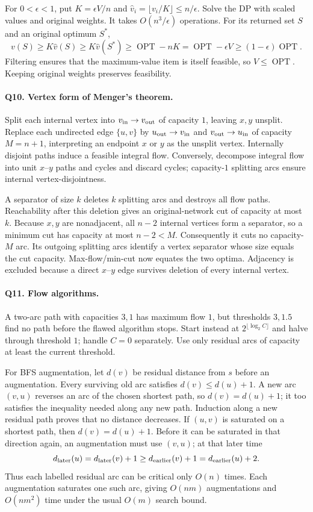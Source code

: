 \documentclass[10pt]{article}
\theoremstyle{definition}
\newcommand{\OPT}{\operatorname{OPT}}
\begin{document}
For $0<\epsilon<1$, put $K=\epsilon V/n$ and
$\widehat v_i=\lfloor v_i/K\rfloor\le n/\epsilon$.  Solve the DP with
scaled values and original weights.  It takes $O(n^3/\epsilon)$ operations.
For its returned set $S$ and an original optimum $S^*$,
\[
v(S)\ge K\widehat v(S)\ge K\widehat v(S^*)
\ge\OPT-nK=\OPT-\epsilon V\ge(1-\epsilon)\OPT.
\]
Filtering ensures that the maximum-value item is itself feasible, so
$V\le\OPT$.  Keeping original weights preserves feasibility.

\paragraph{Q10. Vertex form of Menger's theorem.}
Split each internal vertex into $v_{\rm in}\to v_{\rm out}$ of capacity
$1$, leaving $x,y$ unsplit.  Replace each undirected edge $\{u,v\}$ by
$u_{\rm out}\to v_{\rm in}$ and $v_{\rm out}\to u_{\rm in}$ of capacity
$M=n+1$, interpreting an endpoint $x$ or $y$ as the unsplit vertex.
Internally disjoint paths induce a feasible integral flow.  Conversely,
decompose integral flow into unit $x$--$y$ paths and cycles and discard
cycles; capacity-$1$ splitting arcs ensure internal vertex-disjointness.

A separator of size $k$ deletes $k$ splitting arcs and destroys all flow
paths.  Reachability after this deletion gives an original-network cut
of capacity at most $k$.  Because $x,y$ are nonadjacent, all $n-2$ internal
vertices form a separator, so a minimum cut has capacity at most
$n-2<M$.  Consequently it cuts no capacity-$M$ arc.  Its outgoing splitting
arcs identify a vertex separator whose size equals the cut capacity.
Max-flow/min-cut now equates the two optima.  Adjacency is excluded because
a direct $x$--$y$ edge survives deletion of every internal vertex.

\paragraph{Q11. Flow algorithms.}
A two-arc path with capacities $3,1$ has maximum flow $1$, but thresholds
$3,1.5$ find no path before the flawed algorithm stops.  Start instead at
$2^{\lfloor\log_2 C\rfloor}$ and halve through threshold $1$; handle $C=0$
separately.  Use only residual arcs of capacity at least the current threshold.

For BFS augmentation, let $d(v)$ be residual distance from $s$ before an
augmentation.  Every surviving old arc satisfies $d(v)\le d(u)+1$.
A new arc $(v,u)$ reverses an arc of the chosen shortest path, so
$d(v)=d(u)+1$; it too satisfies the inequality needed along any new path.
Induction along a new residual path proves that no distance decreases.
If $(u,v)$ is saturated on a shortest path, then $d(v)=d(u)+1$.
Before it can be saturated in that direction again, an augmentation must
use $(v,u)$; at that later time
\[
d_{\rm later}(u)=d_{\rm later}(v)+1
\ge d_{\rm earlier}(v)+1=d_{\rm earlier}(u)+2.
\]
Thus each labelled residual arc can be critical only $O(n)$ times.
Each augmentation saturates one such arc, giving $O(nm)$ augmentations
and $O(nm^2)$ time under the usual $O(m)$ search bound.
\end{document}

